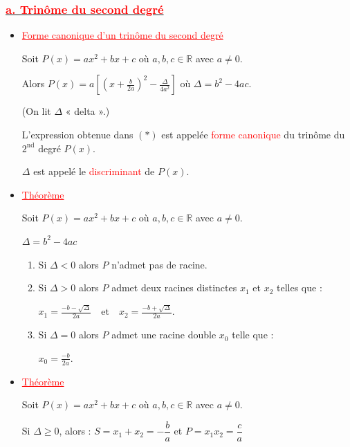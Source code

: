 \documentclass[12pt,a4paper]{article}
\begin{document}
\subsubsection*{\underline{\textbf{\textcolor{red}{a. Trinôme du second degré}}}}
\begin{itemize}

\item \textcolor{red}{\underline{Forme canonique d'un trinôme du second degré}}

Soit 
\(
P(x)=ax^2+bx+c
\)
où $a,b,c\in\mathbb{R}$ avec $a\neq0$.

Alors
\(
P(x)=a\left[\left(x+\frac{b}{2a}\right)^2-\frac{\Delta}{4a^2}\right]
\)
où
\(
\Delta=b^2-4ac.
\)

(On lit $\Delta$ « delta ».)

\medskip

L’expression obtenue dans $(*)$ est appelée \textcolor{red}{forme canonique} du trinôme du $2^{\text{nd}}$ degré $P(x)$.

\medskip

$\Delta$ est appelé le \textcolor{red}{discriminant} de $P(x)$.

\item \textcolor{red}{\underline{Théorème}}

Soit 
\(
P(x)=ax^2+bx+c
\)
où $a,b,c\in\mathbb{R}$ avec $a\neq0$.

\(
\Delta=b^2-4ac
\)

\begin{enumerate}
\item[(i)] Si $\Delta<0$ alors $P$ n’admet pas de racine.

\item[(ii)] Si $\Delta>0$ alors $P$ admet deux racines distinctes $x_1$ et $x_2$ telles que :

\(
x_1=\frac{-b-\sqrt{\Delta}}{2a}
\quad \text{et} \quad
x_2=\frac{-b+\sqrt{\Delta}}{2a}.
\)

\item[(iii)] Si $\Delta=0$ alors $P$ admet une racine double $x_0$ telle que :

\(
x_0=\frac{-b}{2a}.
\)
\end{enumerate}
\item \textcolor{red}{\underline{Théorème}}

Soit $P(x) = ax^2 + bx + c$ où $a,b,c \in \mathbb{R}$ avec $a \neq 0$.

Si $\Delta \geq 0$, alors : $S = x_1 + x_2 = -\dfrac{b}{a}$ et $P = x_1 x_2 = \dfrac{c}{a}$


\end{itemize}
\end{document}
